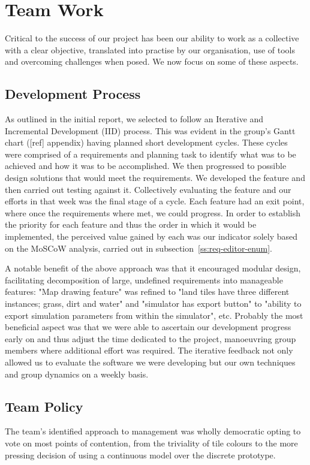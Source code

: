 \section{Team Work}
\label{sec:team_work}
Critical to the success of our project has been our ability to work as a collective with a clear objective, translated into practise by our organisation, use of tools and overcoming challenges when posed. We now focus on some of these aspects.

\subsection{Development Process}\label{ss:dev-process}
As outlined in the initial report, we selected to follow an Iterative and Incremental Development (IID) process. This was evident in the group's Gantt chart ([ref] appendix) having planned short development cycles. These cycles were comprised of a requirements and planning task to identify what was to be achieved and how it was to be accomplished. We then progressed to possible design solutions that would meet the requirements. We developed the feature and then carried out testing against it. Collectively evaluating the feature and our efforts in that week was the final stage of a cycle. Each feature had an exit point, where once the requirements where met, we could progress. In order to establish the priority for each feature and thus the order in which it would be implemented, the perceived value gained by each was our indicator solely based on the MoSCoW analysis, carried out in subsection~\ref{ss:req-editor-enum}.

A notable benefit of the above approach was that it encouraged modular design, facilitating decomposition of large, undefined requirements into manageable features: "Map drawing feature" was refined to "land tiles have three different instances; grass, dirt and water" and "simulator has export button" to "ability to export simulation parameters from within the simulator", etc.  
Probably the most beneficial aspect was that we were able to ascertain our development progress early on and thus adjust the time dedicated to the project, manoeuvring group members where additional effort was required. The iterative feedback not only allowed us to evaluate the software we were developing but our own techniques and group dynamics on a weekly basis.

\subsection{Team Policy}
The team's identified approach to management was wholly democratic opting to vote on most points of contention, from the triviality of tile colours to the more pressing decision of using a continuous model over the discrete prototype.

